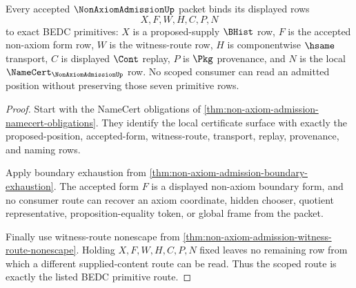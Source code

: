 \begin{theorem}
\label{thm:non-axiom-admission-scoped-route}
Every accepted $\NonAxiomAdmissionUp$ packet binds its displayed rows
$$
X,F,W,H,C,P,N
$$
to exact BEDC primitives: $X$ is a proposed-supply $\BHist$ row, $F$ is the accepted non-axiom form row, $W$ is the witness-route row, $H$ is componentwise $\hsame$ transport, $C$ is displayed $\Cont$ replay, $P$ is $\Pkg$ provenance, and $N$ is the local $\NameCert_{\NonAxiomAdmissionUp}$ row. No scoped consumer can read an admitted position without preserving those seven primitive rows.
\end{theorem}
\begin{proof}
Start with the NameCert obligations of \autoref{thm:non-axiom-admission-namecert-obligations}. They identify the local certificate surface with exactly the proposed-position, accepted-form, witness-route, transport, replay, provenance, and naming rows.

Apply boundary exhaustion from \autoref{thm:non-axiom-admission-boundary-exhaustion}. The accepted form $F$ is a displayed non-axiom boundary form, and no consumer route can recover an axiom coordinate, hidden chooser, quotient representative, proposition-equality token, or global frame from the packet.

Finally use witness-route nonescape from \autoref{thm:non-axiom-admission-witness-route-nonescape}. Holding $X,F,W,H,C,P,N$ fixed leaves no remaining row from which a different supplied-content route can be read. Thus the scoped route is exactly the listed BEDC primitive route.
\end{proof}

